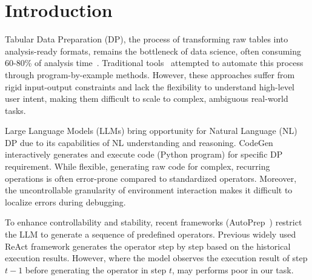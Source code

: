 \section{Introduction}
\label{sec:intro}

% 


Tabular Data Preparation (DP), the process of transforming raw tables into analysis-ready formats, remains the bottleneck of data science, often consuming 60-80\% of analysis time~\cite{dasu2003exploratory}.
Traditional tools~\cite{barowy2015flashrelate, singh2016blinkfill, he2018transform, gulwani2012spreadsheet, jin2017foofah, heer2015predictive} attempted to automate this process through program-by-example methods. However, these approaches suffer from rigid input-output constraints and lack the flexibility to understand high-level user intent, making them difficult to scale to complex, ambiguous real-world tasks. 

Large Language Models (LLMs) bring opportunity for Natural Language (NL) \nlwhat DP due to its capabilities of NL understanding and reasoning. 
CodeGen~\cite{sapkota2025vibe} interactively generates and execute code (\eg Python program) for specific DP requirement. While flexible, generating raw code for complex, recurring operations is often error-prone compared to standardized operators. Moreover, the uncontrollable granularity of environment interaction makes it difficult to localize errors during debugging. 

To enhance controllability and stability, recent frameworks (\eg AutoPrep~\cite{fan2024autoprep}) restrict the LLM to generate a sequence of predefined operators. 
Previous widely used ReAct framework generates the operator step by step based on the historical execution results. However, 
where the model observes the execution result of step $t-1$ before generating the operator in step $t$, may performs poor in our task.


